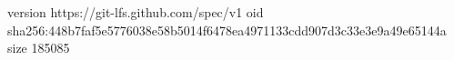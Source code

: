 version https://git-lfs.github.com/spec/v1
oid sha256:448b7faf5e5776038e58b5014f6478ea4971133cdd907d3c33e3e9a49e65144a
size 185085
